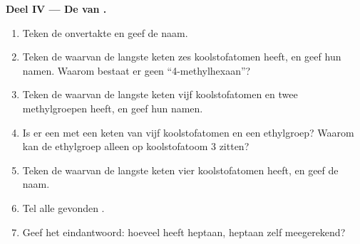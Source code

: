 \begin{problem}
\medskip
\noindent\textbf{Deel IV --- De  van .}
\begin{enumerate}[resume]
  \item Teken de onvertakte  en geef de naam.
  \item Teken de  waarvan de langste keten zes koolstofatomen
        heeft, en geef hun namen. Waarom bestaat er geen
        ``4-methylhexaan''?
  \item Teken de  waarvan de langste keten vijf koolstofatomen en
        twee methylgroepen heeft, en geef hun namen.
  \item Is er een  met een keten van vijf koolstofatomen en een
        ethylgroep? Waarom kan de ethylgroep alleen op koolstofatoom 3
        zitten?
  \item Teken de  waarvan de langste keten vier koolstofatomen
        heeft, en geef de naam.
  \item Tel alle gevonden .
  \item Geef het eindantwoord: hoeveel  heeft heptaan,
        heptaan zelf meegerekend?
\end{enumerate}
\end{problem}
